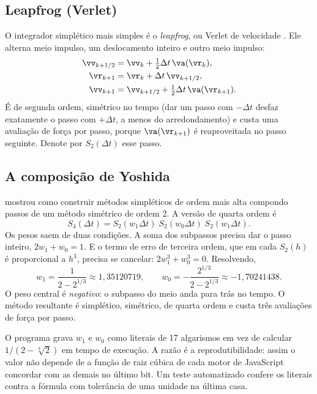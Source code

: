 \subsection{Leapfrog (Verlet)}

O integrador simplético mais simples é o \emph{leapfrog}, ou Verlet de velocidade \cite{verlet1967}. Ele alterna meio impulso, um deslocamento inteiro e outro meio impulso:
\begin{align}
  \vv_{k+1/2} &= \vv_k + \tfrac12\Delta t\,\va(\vr_k), \nonumber\\
  \vr_{k+1}   &= \vr_k + \Delta t\,\vv_{k+1/2}, \label{eq:leapfrog}\\
  \vv_{k+1}   &= \vv_{k+1/2} + \tfrac12\Delta t\,\va(\vr_{k+1}). \nonumber
\end{align}
É de segunda ordem, simétrico no tempo (dar um passo com $-\Delta t$ desfaz exatamente o passo com $+\Delta t$, a menos do arredondamento) e custa uma avaliação de força por passo, porque $\va(\vr_{k+1})$ é reaproveitada no passo seguinte. Denote por $S_2(\Delta t)$ esse passo.

\subsection{A composição de Yoshida}

 mostrou como construir métodos simpléticos de ordem mais alta compondo passos de um método simétrico de ordem 2. A versão de quarta ordem é
\begin{equation}
  S_4(\Delta t) = S_2(w_1\Delta t)\;S_2(w_0\Delta t)\;S_2(w_1\Delta t).
  \label{eq:yoshida}
\end{equation}
Os pesos saem de duas condições. A soma dos subpassos precisa dar o passo inteiro, $2w_1 + w_0 = 1$. E o termo de erro de terceira ordem, que em cada $S_2(h)$ é proporcional a $h^3$, precisa se cancelar: $2w_1^3 + w_0^3 = 0$. Resolvendo,
\begin{equation}
  w_1 = \frac{1}{2 - 2^{1/3}} \approx 1{,}35120719,\qquad
  w_0 = -\frac{2^{1/3}}{2 - 2^{1/3}} \approx -1{,}70241438.
  \label{eq:pesos-yoshida}
\end{equation}
O peso central é \emph{negativo}: o subpasso do meio anda para trás no tempo. O método resultante é simplético, simétrico, de quarta ordem e custa três avaliações de força por passo.

\begin{paraaprofundar}
O programa grava $w_1$ e $w_0$ como literais de 17 algarismos em vez de calcular $1/(2-\sqrt[3]{2})$ em tempo de execução. A razão é a reprodutibilidade: assim o valor não depende de a função de raiz cúbica de cada motor de JavaScript concordar com as demais no último bit. Um teste automatizado confere os literais contra a fórmula com tolerância de uma unidade na última casa.
\end{paraaprofundar}

